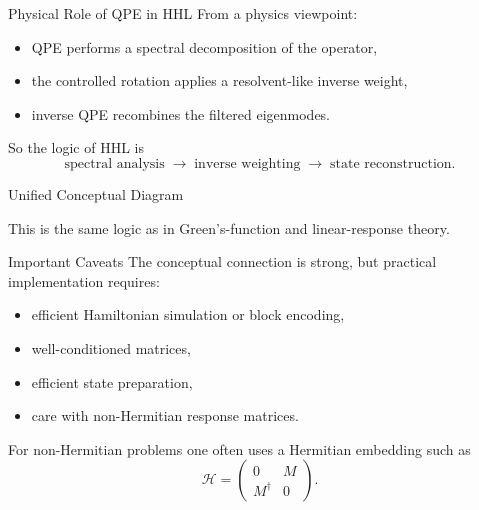 \documentclass{beamer}
\begin{document}
\begin{frame}{Physical Role of QPE in HHL}
From a physics viewpoint:
\begin{itemize}
\item QPE performs a spectral decomposition of the operator,
\item the controlled rotation applies a resolvent-like inverse weight,
\item inverse QPE recombines the filtered eigenmodes.
\end{itemize}

So the logic of HHL is
\[
\text{spectral analysis}
\;\rightarrow\;
\text{inverse weighting}
\;\rightarrow\;
\text{state reconstruction}.
\]
\end{frame}


\begin{frame}{Unified Conceptual Diagram}
\centering
{}

\vspace{0.5cm}
This is the same logic as in Green's-function and linear-response theory.
\end{frame}


\begin{frame}{Important Caveats}
The conceptual connection is strong, but practical implementation requires:
\begin{itemize}
\item efficient Hamiltonian simulation or block encoding,
\item well-conditioned matrices,
\item efficient state preparation,
\item care with non-Hermitian response matrices.
\end{itemize}

For non-Hermitian problems one often uses a Hermitian embedding such as
\[
\mathcal{H}=
\begin{pmatrix}
0 & M \\
M^\dagger & 0
\end{pmatrix}.
\]
\end{frame}
\end{document}
